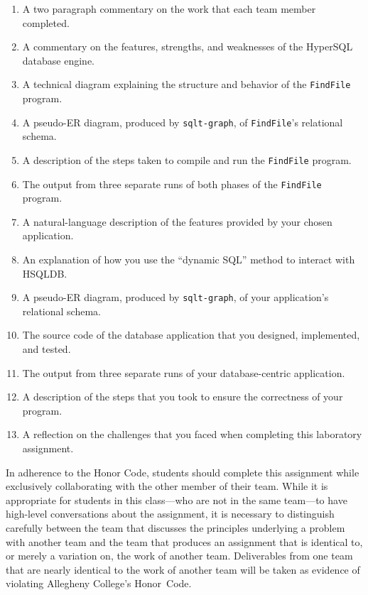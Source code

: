 \begin{enumerate}
    \setlength{\itemsep}{0pt}
  \item A two paragraph commentary on the work that each team member completed. 
  \item A commentary on the features, strengths, and weaknesses of the HyperSQL database engine.
  \item A technical diagram explaining the structure and behavior of the {\tt FindFile} program.
  \item A pseudo-ER diagram, produced by {\tt sqlt-graph}, of {\tt FindFile}'s relational schema.
  \item A description of the steps taken to compile and run the {\tt FindFile} program.
  \item The output from three separate runs of both phases of the {\tt FindFile} program.
  \item A natural-language description of the features provided by your chosen application.
  \item An explanation of how you use the ``dynamic SQL'' method to interact with HSQLDB.
  \item A pseudo-ER diagram, produced by {\tt sqlt-graph}, of your application's relational schema.
  \item The source code of the database application that you designed, implemented, and tested.
  \item The output from three separate runs of your database-centric application.
  \item A description of the steps that you took to ensure the correctness of your program.
  \item A reflection on the challenges that you faced when completing this laboratory assignment.
\end{enumerate}


In adherence to the Honor Code, students should complete this assignment while exclusively collaborating with the
other member of their team. While it is appropriate for students in this class---who are not in the same team---to have
high-level conversations about the assignment, it is necessary to distinguish carefully between the team that discusses
the principles underlying a problem with another team and the team that produces an assignment that is identical to, or
merely a variation on, the work of another team.  Deliverables from one team that are nearly identical to the work of
another team will be taken as evidence of violating Allegheny College's \mbox{Honor Code}.



